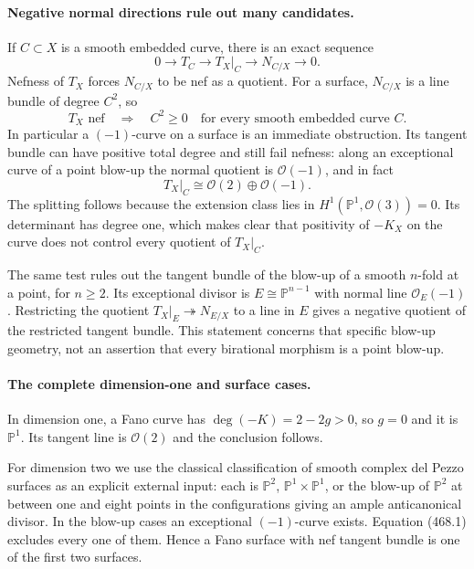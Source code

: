 \documentclass[11pt]{article}
\begin{document}
\paragraph{Negative normal directions rule out many candidates.}
If $C\subset X$ is a smooth embedded curve, there is an exact sequence
\[
 0\longrightarrow T_C\longrightarrow T_X|_C
 \longrightarrow N_{C/X}\longrightarrow0.
\]
Nefness of $T_X$ forces $N_{C/X}$ to be nef as a quotient.
For a surface, $N_{C/X}$ is a line bundle of degree $C^2$, so
\[
 T_X\text{ nef}\quad\Longrightarrow\quad C^2\geq0
 \quad\text{for every smooth embedded curve }C.
 \tag{468.1}
\]
In particular a $(-1)$-curve on a surface is an immediate obstruction.
Its tangent bundle can have positive total degree and still fail
nefness: along an exceptional curve of a point blow-up the normal
quotient is $\mathcal O(-1)$, and in fact
\[
 T_X|_C\cong\mathcal O(2)\oplus\mathcal O(-1).
\]
The splitting follows because the extension class lies in
$H^1(\mathbb P^1,\mathcal O(3))=0$. Its determinant has degree one,
which makes clear that positivity of $-K_X$ on the curve does not
control every quotient of $T_X|_C$.

The same test rules out the tangent bundle of the blow-up of a smooth
$n$-fold at a point, for $n\geq2$. Its exceptional divisor is
$E\cong\mathbb P^{n-1}$ with normal line $\mathcal O_E(-1)$.
Restricting the quotient $T_X|_E\twoheadrightarrow N_{E/X}$ to a
line in $E$ gives a negative quotient of the restricted tangent bundle.
This statement concerns that specific blow-up geometry, not an assertion
that every birational morphism is a point blow-up.

\paragraph{The complete dimension-one and surface cases.}
In dimension one, a Fano curve has $\deg(-K)=2-2g>0$, so $g=0$
and it is $\mathbb P^1$. Its tangent line is $\mathcal O(2)$ and the
conclusion follows.

For dimension two we use the classical classification of smooth complex
del Pezzo surfaces as an explicit external input: each is $\mathbb P^2$,
$\mathbb P^1\times\mathbb P^1$, or the blow-up of $\mathbb P^2$ at
between one and eight points in the configurations giving an ample
anticanonical divisor. In the blow-up cases an exceptional $(-1)$-curve
exists. Equation (468.1) excludes every one of them. Hence a Fano surface
with nef tangent bundle is one of the first two surfaces.
\end{document}

